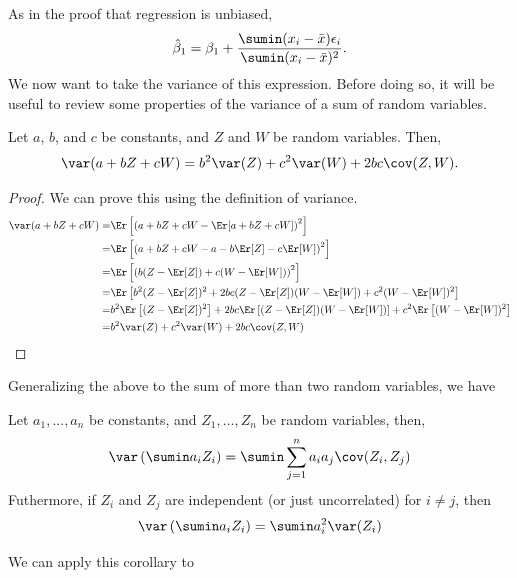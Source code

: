 As in the proof that regression is unbiased, 
\begin{align*}
  \hat{\beta}_1 = \beta_1 + \frac{\sumin (x_i - \bar{x})
    \epsilon_i}{\sumin (x_i - \bar{x})^2}. 
\end{align*}
We now want to take the variance of this expression. Before doing so,
it will be useful to review some properties of the variance of a sum
of random variables. 
\begin{lemma}
  Let $a$, $b$, and $c$ be constants, and $Z$ and $W$ be random
  variables. Then,
  \[ \var(a + bZ + cW) = b^2 \var(Z) + c^2 \var(W) + 2 bc
  \cov(Z,W). \]
\end{lemma}
\begin{proof}
  We can prove this using the definition of variance. 
  \begin{align*}
    \var(a + bZ + cW) = & \Er\left[ \left(a + bZ + cW - \Er[a + bZ + cW]\right)^2 \right] \\
    = & \Er\left[ \left(a + bZ + cW - a - b\Er[Z] - c\Er[W]\right)^2
    \right] \\
    = & \Er\left[\left(b(Z - \Er[Z]) + c(W - \Er[W]) \right)^2 \right]
    \\
    = & \Er\left[ b^2 (Z - \Er[Z])^2 + 2bc (Z - \Er[Z])(W - \Er[W]) +
      c^2 (W - \Er[W])^2 \right] \\
    = & b^2\Er\left[  (Z - \Er[Z])^2\right] + 2bc \Er\left[ (Z - \Er[Z])(W - \Er[W]) \right]+
    c^2 \Er\left[ (W - \Er[W])^2 \right] \\
    = & b^2 \var(Z) + c^2 \var(W) + 2 bc \cov(Z,W)
  \end{align*}
\end{proof}
Generalizing the above to the sum of more than two random variables,
we have
\begin{corollary}
  Let $a_1, ..., a_n$ be constants, and $Z_1, ..., Z_n$ be random
  variables, then,
  \[
  \var\left( \sumin a_i Z_i \right)  = \sumin \sum_{j=1}^n a_i a_j
  \cov(Z_i, Z_j) 
  \]
  Futhermore, if $Z_i$ and $Z_j$ are independent (or just
  uncorrelated) for $i \neq j$, then
  \[
  \var\left( \sumin a_i Z_i \right)  = \sumin a_i^2 \var(Z_i)
  \]
\end{corollary}
We can apply this corollary to 
